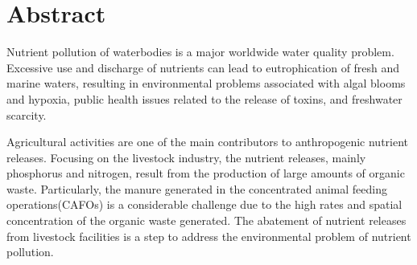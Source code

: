 
\chapter*{Abstract}


Nutrient pollution of waterbodies is a major worldwide water quality problem. Excessive use and discharge of nutrients can lead to eutrophication of fresh and marine waters, resulting in environmental problems associated with algal blooms and hypoxia, public health issues related to the release of toxins, and freshwater scarcity. 

Agricultural activities are one of the main contributors to anthropogenic nutrient releases. Focusing on the livestock industry, the nutrient releases, mainly phosphorus and nitrogen, result from the production of large amounts of organic waste. 
Particularly, the manure generated in the concentrated animal feeding oper­ations(CAFOs) is a considerable challenge due to the high rates and spatial concentration of the organic waste generated.
The abatement of nutrient releases from livestock facilities is a step to address the environmental problem of nutrient pollution.

